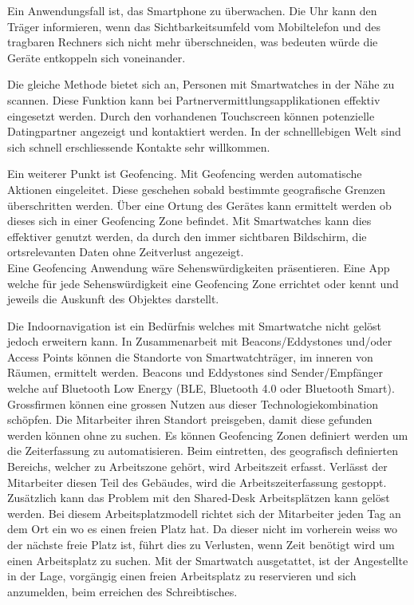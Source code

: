 Ein Anwendungsfall ist, das Smartphone zu überwachen. Die Uhr kann den Träger informieren, wenn das Sichtbarkeitsumfeld vom Mobiltelefon und des tragbaren Rechners sich nicht mehr überschneiden, was bedeuten würde die Geräte entkoppeln sich voneinander.

Die gleiche Methode bietet sich an, Personen mit Smartwatches in der Nähe zu scannen. Diese Funktion kann bei Partnervermittlungsapplikationen effektiv eingesetzt werden. Durch den vorhandenen Touchscreen können potenzielle Datingpartner angezeigt und kontaktiert werden. In der schnelllebigen Welt sind sich schnell erschliessende Kontakte sehr willkommen.

Ein weiterer Punkt ist Geofencing. Mit Geofencing werden automatische Aktionen eingeleitet. Diese geschehen sobald bestimmte geografische Grenzen überschritten werden. Über eine Ortung des Gerätes kann ermittelt werden ob dieses sich in einer Geofencing Zone befindet. Mit Smartwatches kann dies effektiver genutzt werden, da durch den immer sichtbaren Bildschirm, die ortsrelevanten Daten ohne Zeitverlust angezeigt.\\
Eine Geofencing Anwendung wäre Sehenswürdigkeiten präsentieren. Eine App welche für jede Sehenswürdigkeit eine Geofencing Zone errichtet oder kennt und jeweils die Auskunft des Objektes darstellt.

Die Indoornavigation ist ein Bedürfnis welches mit Smartwatche nicht gelöst jedoch erweitern kann. In Zusammenarbeit mit Beacons/Eddystones und/oder Access Points können die Standorte von Smartwatchträger, im inneren von Räumen, ermittelt werden. Beacons und Eddystones sind Sender/Empfänger welche auf Bluetooth Low Energy (BLE, Bluetooth 4.0 oder  Bluetooth Smart).\\
Grossfirmen können eine grossen Nutzen aus dieser Technologiekombination schöpfen. Die Mitarbeiter ihren Standort preisgeben, damit diese gefunden werden können ohne zu suchen. Es können Geofencing Zonen definiert werden um die Zeiterfassung zu automatisieren. Beim eintretten, des geografisch definierten Bereichs, welcher zu Arbeitszone gehört, wird Arbeitszeit erfasst. Verlässt der Mitarbeiter diesen Teil des Gebäudes, wird die Arbeitszeiterfassung gestoppt.\\
Zusätzlich kann das Problem mit den Shared-Desk Arbeitsplätzen kann gelöst werden. Bei diesem Arbeitsplatzmodell richtet sich der Mitarbeiter jeden Tag an dem Ort ein wo es einen freien Platz hat. Da dieser nicht im vorherein weiss wo der nächste freie Platz ist, führt dies zu Verlusten, wenn Zeit benötigt wird um einen Arbeitsplatz zu suchen. Mit der Smartwatch ausgetattet, ist der Angestellte in der Lage, vorgängig einen freien Arbeitsplatz zu reservieren und sich anzumelden, beim erreichen des Schreibtisches.
\newpage

